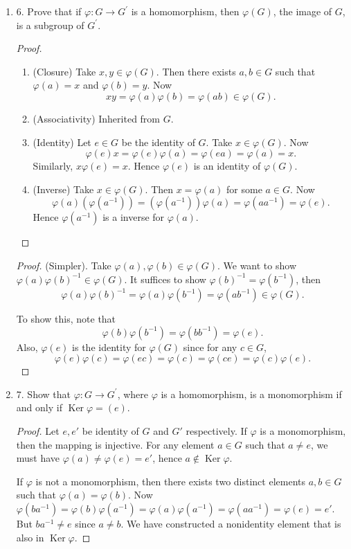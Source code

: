 \begin{enumerate}[resume]
\item 6. Prove that if $\varphi: G \rightarrow G^{\prime}$ is a homomorphism, then $\varphi(G)$, the image of $G$, is a subgroup of $G^{\prime}$.
\begin{proof}
	\begin{enumerate}
		\item (Closure) Take $x,y \in \varphi(G)$. Then there exists $a, b \in G$ such that $\varphi(a) = x$ and $\varphi(b) = y$. Now \[
			xy = \varphi(a) \varphi(b) = \varphi(ab) \in \varphi(G)
		.\]  
	\item (Associativity) Inherited from $G$.
	\item (Identity) Let $e \in G$ be the identity of $G$. Take $x \in \varphi(G)$. Now
		\[
			\varphi(e) x = \varphi(e)\varphi(a) = \varphi(ea) = \varphi(a) = x
		.\] 
		Similarly, $x \varphi(e) = x$. Hence $\varphi(e)$ is an identity of $\varphi(G)$.
	\item (Inverse) Take $x \in \varphi(G)$. Then $x = \varphi(a)$ for some $a \in G$. Now
		\[
			\varphi(a)(\varphi(a^{-1} ))=(\varphi(a^{-1} ))\varphi(a)=\varphi(a a^{-1} ) = \varphi(e)
		.\] 
		Hence $\varphi(a^{-1})$ is a inverse for $\varphi(a)$.
	\end{enumerate}
\end{proof}
\begin{proof}
	(Simpler). Take $\varphi(a), \varphi(b) \in \varphi(G)$. We want to show $\varphi(a)\varphi(b)^{-1} \in \varphi(G)$. It suffices to show $\varphi(b)^{-1} = \varphi(b^{-1} )$, then
	\[
		\varphi(a)\varphi(b)^{-1} = \varphi(a)\varphi(b^{-1} ) = \varphi(ab^{-1} ) \in \varphi(G)
	.\] 

	To show this, note that \[
		\varphi(b) \varphi(b^{-1} ) = \varphi(b b^{-1} ) = \varphi(e)
	.\] 
	Also, $\varphi(e)$ is the identity for $\varphi(G)$ since for any $c \in G$, 
	\[
		\varphi(e)\varphi(c) = \varphi(ec) = \varphi(c) = \varphi(ce) = \varphi(c)\varphi(e)
	.\] 
\end{proof}


\item 7. Show that $\varphi: G \rightarrow G^{\prime}$, where $\varphi$ is a homomorphism, is a monomorphism if and only if $\operatorname{Ker} \varphi=(e)$.
\begin{proof}
	Let $e, e'$ be identity of $G$ and $G'$ respectively. If $\varphi$ is a monomorphism, then the mapping is injective. For any element $a \in G$ such that $a \neq e$, we must have $\varphi(a) \neq  \varphi(e) = e'$, hence $a \not\in \operatorname{Ker} \varphi$.

	If $\varphi$ is not a monomorphism, then there exists two distinct elements $a, b \in G$ such that $\varphi(a) = \varphi(b)$. Now $\varphi(ba^{-1}) = \varphi(b)\varphi(a^{-1} ) = \varphi(a)\varphi(a^{-1} )=\varphi(a a^{-1}) = \varphi(e) = e'$. But $ba^{-1} \neq e$ since $a \neq  b$. We have constructed a nonidentity element that is also in $\operatorname{Ker} \varphi$.
\end{proof}

\end{enumerate}
	
